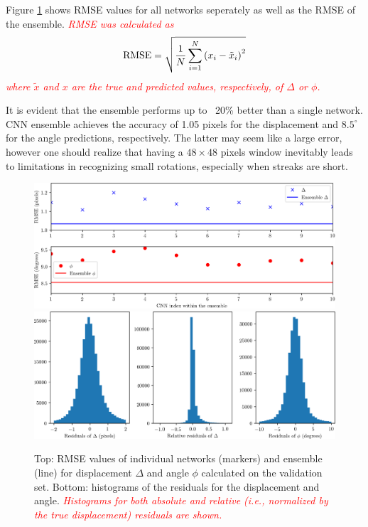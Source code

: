 \documentclass{svjour3}                     %
\newcommand{\new}[1]{\textit{\textcolor{red}{#1}}}
\begin{document}
Figure \ref{fig:fig3} shows RMSE values for all networks seperately as well as the RMSE of the ensemble. \new{RMSE was calculated as} 
\begin{equation}
\textnormal{RMSE} = \sqrt{\frac{1}{N}\sum_{i = 1}^N{\left(x_i - \tilde{x}_i\right)^2}}
\end{equation}
\new{where $\tilde{x}$ and $x$ are the true and predicted values, respectively, of $\Delta$ or $\phi$.}

It is evident that the ensemble performs up to ~20\% better than a single network. CNN ensemble achieves the accuracy of 1.05 pixels for the displacement and $8.5^{\circ}$ for the angle predictions, respectively. The latter may seem like a large error, however one should realize that having a $48 \times 48$ pixels window inevitably leads to limitations in recognizing small rotations, especially when streaks are short. 

\begin{figure}
\includegraphics[width=\textwidth]{figs/figure2a.png}
\includegraphics[width=\textwidth]{figs/figure2b.png}
\caption{Top: RMSE values of individual networks (markers) and ensemble (line) for displacement $\Delta$ and angle $\phi$ calculated on the validation set. Bottom: histograms of the residuals for the displacement and angle. \new{Histograms for both absolute and relative (i.e., normalized by the true displacement) residuals are shown.}}
\label{fig:fig3}
\end{figure}
\end{document}
